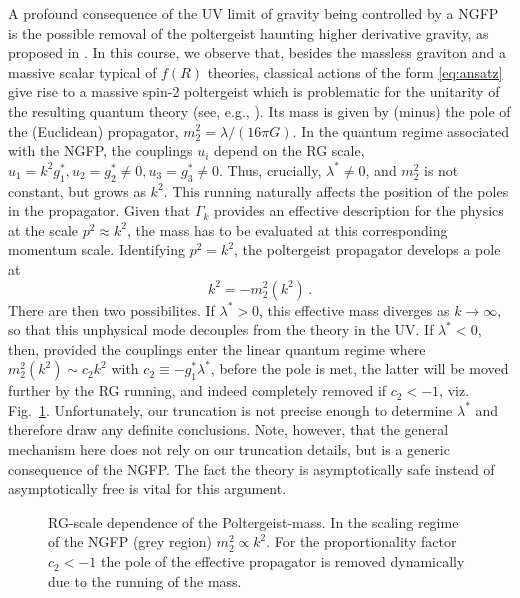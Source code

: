 \documentclass[11pt,reqno]{article}
\renewcommand{\baselinestretch}{1.18}
\newcommand{\be}{\begin{equation}}
\newcommand{\ee}{\end{equation}}
\newcommand{\2}{\sqrt{2\,}}
\begin{document}
A profound consequence of the UV limit of gravity being controlled by a NGFP is the possible removal of the poltergeist haunting higher derivative gravity, as proposed in \cite{Julve:1978xn,Salam:1978fd,Floreanini:1995}.
In this course, we observe that, 
besides the massless graviton and a massive scalar typical of $f(R)$ theories, classical actions of the form \eqref{eq:ansatz} give rise to a massive spin-2 poltergeist which is problematic for the unitarity of the resulting quantum theory (see, e.g., \cite{Stelle:1976gc,Stelle:1977ry}). 
Its mass is given by (minus) the pole of the (Euclidean) propagator, $m_{2}^{2}=\lambda/(16 \pi G)$.
In the quantum regime associated with the NGFP, the couplings $u_i$ depend on the RG scale,
%
$u_1 = k^2 g_1^*, u_2 = g_2^* \not = 0, u_3 = g_3^* \not = 0$. Thus, crucially, $\lambda^* \not = 0$,
%
and $m_2^2$ is not constant, but grows as $k^2$. This running naturally affects the position of the poles in the propagator. Given that $\Gamma_k$ provides an effective description for the physics at the scale $p^2 \approx k^2$, the mass has to be evaluated at this corresponding momentum scale. Identifying $p^2 = k^2$, the poltergeist propagator develops a pole at 
%
\be
k^2 = - m_{2}^{2}(k^2)\, .
\ee
There are then two possibilites. If  $\lambda^* > 0$, this effective mass diverges as $k \rightarrow \infty$, so that this unphysical mode
decouples from the theory in the UV. If $\lambda^* < 0$, then, provided the couplings enter the linear quantum regime where
$m_{2}^{2}(k^2)\sim c_2 k^2$ with $c_2 \equiv -g_1^* \lambda^*$, 
before the pole is met, the latter will be moved further by the RG running, and indeed completely removed if $c_2<-1$, viz. Fig.\ \ref{fig1}.
Unfortunately, our truncation is not precise enough to determine $\lambda^*$ and therefore draw any definite conclusions.
Note, however, that the general mechanism here does not rely on our truncation details, but is a generic consequence of the NGFP. The fact the theory is asymptotically safe instead of asymptotically free is vital for this argument.
%
%
\begin{figure}[h]
\vspace{-3mm}
\renewcommand{\baselinestretch}{1}
\textwidth
\begin{center}
\leavevmode
{} 
\end{center}
\caption{\label{fig1}{RG-scale dependence of the Poltergeist-mass. In the scaling regime of the NGFP (grey region) $m^2_2 \propto k^2$. For the proportionality factor $c_2 < -1$ the pole of the effective propagator is removed dynamically due to the running of the mass.}}
\end{figure}
\end{document}
